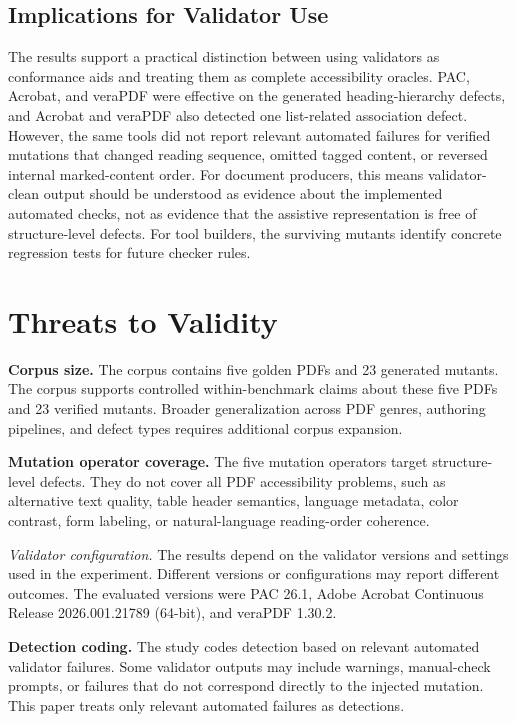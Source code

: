 \documentclass[conference]{IEEEtran}
\begin{document}
\subsection{Implications for Validator Use}

The results support a practical distinction between using validators as conformance aids and treating them as complete accessibility oracles. PAC, Acrobat, and veraPDF were effective on the generated heading-hierarchy defects, and Acrobat and veraPDF also detected one list-related association defect. However, the same tools did not report relevant automated failures for verified mutations that changed reading sequence, omitted tagged content, or reversed internal marked-content order. For document producers, this means validator-clean output should be understood as evidence about the implemented automated checks, not as evidence that the assistive representation is free of structure-level defects. For tool builders, the surviving mutants identify concrete regression tests for future checker rules.

\section{Threats to Validity}

\textbf{Corpus size.} The corpus contains five golden PDFs and 23 generated mutants. The corpus supports controlled within-benchmark claims about these five PDFs and 23 verified mutants. Broader generalization across PDF genres, authoring pipelines, and defect types requires additional corpus expansion.

\textbf{Mutation operator coverage.} The five mutation operators target structure-level defects. They do not cover all PDF accessibility problems, such as alternative text quality, table header semantics, language metadata, color contrast, form labeling, or natural-language reading-order coherence.

\textit{Validator configuration.} The results depend on the validator versions and settings used in the experiment. Different versions or configurations may report different outcomes. The evaluated versions were PAC 26.1, Adobe Acrobat Continuous Release 2026.001.21789 (64-bit), and veraPDF 1.30.2.

\textbf{Detection coding.} The study codes detection based on relevant automated validator failures. Some validator outputs may include warnings, manual-check prompts, or failures that do not correspond directly to the injected mutation. This paper treats only relevant automated failures as detections.
\end{document}
